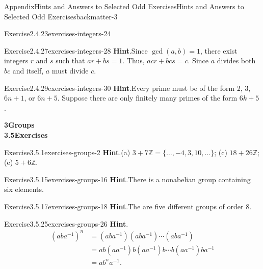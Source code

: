 \documentclass[oneside,10pt,]{book}
\newcommand{\blocktitlefont}{\relax}
\numberwithin{equation}{section}
\begin{document}
\begin{solutions-chapter}{Appendix}{Hints and Answers to Selected Odd Exercises}{}{Hints and Answers to Selected Odd Exercises}{}{}{backmatter-3}
\begin{divisionsolution}{Exercise}{2.4.23}{}{exercises-integers-24}
\end{divisionsolution}%
\begin{divisionsolution}{Exercise}{2.4.27}{}{exercises-integers-28}%
\noindent\textbf{\blocktitlefont Hint}.\hypertarget{exercises-integers-28-2-back}{}\quad{}Since \(\gcd(a,b) = 1\), there exist integers \(r\) and \(s\) such that \(ar + bs = 1\).   Thus, \(acr + bcs = c\). Since \(a\) divides both \(bc\) and itself, \(a\) must divide \(c\).%
\end{divisionsolution}%
\begin{divisionsolution}{Exercise}{2.4.29}{}{exercises-integers-30}%
\noindent\textbf{\blocktitlefont Hint}.\hypertarget{exercises-integers-30-2-back}{}\quad{}Every prime must be of the form 2, 3, \(6n + 1\), or \(6n + 5\).   Suppose there are only finitely many primes of the form \(6k + 5\).%
\end{divisionsolution}%
\par\medskip
\noindent\textbf{\Large{}3\space\textperiodcentered\space{}Groups\\
3.5\space\textperiodcentered\space{}Exercises}
\begin{divisionsolution}{Exercise}{3.5.1}{}{exercises-groups-2}%
\noindent\textbf{\blocktitlefont Hint}.\hypertarget{exercises-groups-2-2-back}{}\quad{}(a) \(3 + 7 \mathbb Z = \{ \ldots, -4, 3, 10, \ldots \}\);  (c) \(18 + 26 \mathbb Z\);  (e) \(5 + 6 \mathbb Z\).%
\end{divisionsolution}%
\begin{divisionsolution}{Exercise}{3.5.15}{}{exercises-groups-16}%
\noindent\textbf{\blocktitlefont Hint}.\hypertarget{exercises-groups-16-2-back}{}\quad{}There is a nonabelian group containing six elements.%
\end{divisionsolution}%
\begin{divisionsolution}{Exercise}{3.5.17}{}{exercises-groups-18}%
\noindent\textbf{\blocktitlefont Hint}.\hypertarget{exercises-groups-18-2-back}{}\quad{}The are five different groups of order 8.%
\end{divisionsolution}%
\begin{divisionsolution}{Exercise}{3.5.25}{}{exercises-groups-26}%
\noindent\textbf{\blocktitlefont Hint}.\hypertarget{exercises-groups-26-2-back}{}\quad{}%
\begin{align*}
(aba^{-1})^n & = (aba^{-1})(aba^{-1}) \cdots (aba^{-1})\\
& = ab(aa^{-1})b(aa^{-1})b \cdots b(aa^{-1})ba^{-1}\\
& = ab^na^{-1}.
\end{align*}

\end{divisionsolution}
\end{solutions-chapter}
\end{document}
